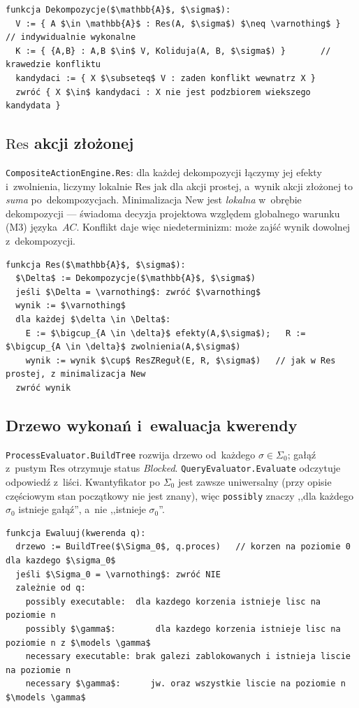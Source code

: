 \documentclass[11pt,a4paper]{article}
\newcommand{\Res}{\mathrm{Res}}
\newcommand{\New}{\mathrm{New}}
\begin{document}
\begin{lstlisting}[style=ds4pseudo]
funkcja Dekompozycje($\mathbb{A}$, $\sigma$):
  V := { A $\in \mathbb{A}$ : Res(A, $\sigma$) $\neq \varnothing$ }    // indywidualnie wykonalne
  K := { {A,B} : A,B $\in$ V, Koliduja(A, B, $\sigma$) }       // krawedzie konfliktu
  kandydaci := { X $\subseteq$ V : zaden konflikt wewnatrz X }
  zwróć { X $\in$ kandydaci : X nie jest podzbiorem wiekszego kandydata }
\end{lstlisting}

\subsection{$\Res$ akcji złożonej}
\texttt{CompositeActionEngine.Res}: dla każdej dekompozycji łączymy jej efekty
i~zwolnienia, liczymy lokalnie $\Res$ jak dla akcji prostej, a~wynik akcji
złożonej to \emph{suma} po~dekompozycjach. Minimalizacja $\New$ jest
\emph{lokalna} w~obrębie dekompozycji --- świadoma decyzja projektowa względem
globalnego warunku (M3) języka~$AC$. Konflikt daje więc niedeterminizm: może
zajść wynik dowolnej z~dekompozycji.

\begin{lstlisting}[style=ds4pseudo]
funkcja Res($\mathbb{A}$, $\sigma$):
  $\Delta$ := Dekompozycje($\mathbb{A}$, $\sigma$)
  jeśli $\Delta = \varnothing$: zwróć $\varnothing$
  wynik := $\varnothing$
  dla każdej $\delta \in \Delta$:
    E := $\bigcup_{A \in \delta}$ efekty(A,$\sigma$);   R := $\bigcup_{A \in \delta}$ zwolnienia(A,$\sigma$)
    wynik := wynik $\cup$ ResZReguł(E, R, $\sigma$)   // jak w Res prostej, z minimalizacja New
  zwróć wynik
\end{lstlisting}

\subsection{Drzewo wykonań i~ewaluacja kwerendy}
\texttt{ProcessEvaluator.BuildTree} rozwija drzewo od~każdego $\sigma \in
\Sigma_0$; gałąź z~pustym $\Res$ otrzymuje status \emph{Blocked}.
\texttt{QueryEvaluator.Evaluate} odczytuje odpowiedź z~liści. Kwantyfikator po
$\Sigma_0$ jest zawsze uniwersalny (przy opisie częściowym stan początkowy nie
jest znany), więc \texttt{possibly} znaczy ,,dla każdego $\sigma_0$ istnieje
gałąź'', a~nie ,,istnieje $\sigma_0$''.

\begin{lstlisting}[style=ds4pseudo]
funkcja Ewaluuj(kwerenda q):
  drzewo := BuildTree($\Sigma_0$, q.proces)   // korzen na poziomie 0 dla kazdego $\sigma_0$
  jeśli $\Sigma_0 = \varnothing$: zwróć NIE
  zależnie od q:
    possibly executable:  dla kazdego korzenia istnieje lisc na poziomie n
    possibly $\gamma$:        dla kazdego korzenia istnieje lisc na poziomie n z $\models \gamma$
    necessary executable: brak galezi zablokowanych i istnieja liscie na poziomie n
    necessary $\gamma$:      jw. oraz wszystkie liscie na poziomie n $\models \gamma$
\end{lstlisting}
\end{document}

